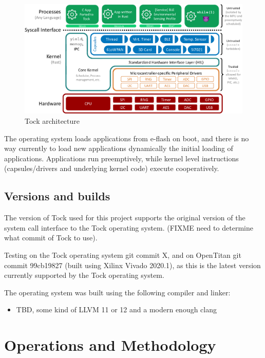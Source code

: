 \documentclass{article}
\begin{document}
\begin{figure}[htp]
    \centering
    \includegraphics[width=\textwidth]{tock-stack.png}
    \caption{Tock architecture\cite{tockgithub-arch}}
    \label{figure:1}
\end{figure}

The operating system loads applications from e-flash on boot, and there is no way currently to load new applications dynamically the initial loading of applications. Applications run preemptively, while kernel level instructions (capsules/drivers and underlying kernel code) execute cooperatively.

\subsection{Versions and builds}

The version of Tock used for this project supports the original version of the system call interface to the Tock operating system. (FIXME need to determine what commit of Tock to use).

Testing on the Tock operating system git commit X, and on OpenTitan git commit 99cb19827 (built using Xilinx Vivado 2020.1), as this is the latest version currently supported by the Tock operating system.

The operating system was built using the following compiler and linker:
\begin{itemize}
    \item TBD, some kind of LLVM 11 or 12 and a modern enough clang
\end{itemize}

\section{Operations and Methodology}
\end{document}
